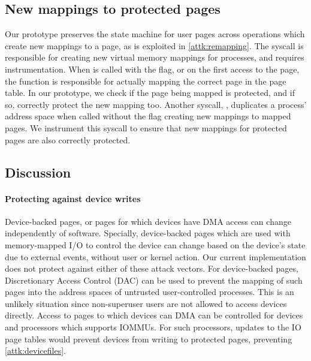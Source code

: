 \documentclass[letterpaper,twocolumn,10pt, anonymous]{article}
\begin{document}
\subsection{New mappings to protected pages}

Our \tiktok prototype preserves the state machine for user pages
across operations which create new mappings to a page, as is 
exploited in \autoref{attk:remapping}.
The  syscall is responsible for creating new virtual
memory mappings for processes, and requires instrumentation.
When  is called with the  flag, or 
on the first access to the page, the  function 
is responsible for actually mapping the correct page in the 
page table. 
In our prototype, we check if the page being mapped is protected, 
and if so, correctly protect the new mapping too.
Another syscall, , duplicates a process' address space
when called without the  flag creating new mappings
to mapped pages. 
We instrument this syscall to ensure that new mappings for protected 
pages are also correctly protected.

\subsection{Discussion}

\paragraph{Protecting against device writes}
Device-backed pages, or pages for which devices have DMA access can 
change independently of software. 
Specially, device-backed pages which are used with memory-mapped I/O 
to control the device can change based on the device's state due to 
external events, without user or kernel action.
Our current implementation does not protect against either of these
attack vectors.
For device-backed pages, Discretionary Access Control (DAC) can 
be used to prevent the mapping of such pages into the address 
spaces of untrusted user-controlled processes.
This is an unlikely situation since non-superuser users are not 
allowed to access devices directly.
Access to pages to which devices can DMA can be controlled for 
devices and processors which supports IOMMUs.
For such processors, updates to the IO page tables would prevent
devices from writing to protected pages, preventing \autoref{attk:devicefiles}.
\end{document}
